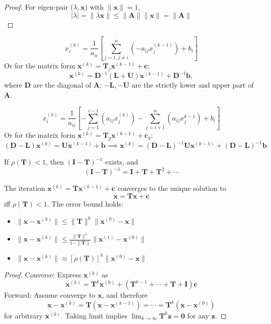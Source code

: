 \begin{proof}
For eigen-pair ($\lambda,\bm x$) with $\|\bm x\|=1$,
\[
|\lambda|=\|\lambda\bm x\|\le\|\bm A\|\|\bm x\|=\|\bm A\|
\]
\end{proof}
\begin{definition}
\[
x_i^{(k)} = \frac{1}{a_{ii}}\left[\sum_{j=1,j\ne i}^n(-a_{ij}x_j^{(k-1)})
+b_i
\right]
\]
Or for the matrix form $\bm x^{(k)}=\bm T_j\bm x^{(k-1)}+\bm c$:
\[
\bm x^{(k)}=\bm D^{-1}(\bm L+\bm U)\bm x^{(k-1)}+\bm D^{-1}\bm b,
\]
where $\bm D$ are the diagonal of $\bm A$; $-\bm L,-\bm U$ are the strictly lower and upper part of $\bm A$.
\end{definition}

\begin{definition}
\[
x_i^{(k)}=\frac{1}{a_{ii}}
\left[
-\sum_{j=1}^{i-1}(a_{ij}x_j^{(k)})-\sum_{j=i+1}^n(a_{ij}x_j^{k-1})+b_i
\right]
\]
Or for the matrix form $\bm x^{(k)}=\bm T_g\bm x^{(k-1)}+\bm c_g$:
\[
(\bm D-\bm L)\bm x^{(k)}=\bm U\bm x^{(k-1)}+\bm b\implies
\bm x^{(k)}=(\bm D-\bm L)^{-1}\bm U\bm x^{(k-1)}+(\bm D-\bm L)^{-1}\bm b
\]
\end{definition}
\begin{proposition}
If $\rho(\bm T)<1$, then $(\bm I-\bm T)^{-1}$ exists, and
\[
(\bm I-\bm T)^{-1}=\bm I+\bm T+\bm T^2+\cdots
\]
\end{proposition}
\begin{proposition}
The iteration
$
\bm x^{(k)}=\bm T\bm x^{(k-1)}+\bm c
$
converges to the unique solution to 
\[
\bm x=\bm T\bm x+\bm c
\]
iff $\rho(\bm T)<1$. The error bound holds:
\begin{itemize}
\item
$\|\bm x-\bm x^{(k)}\|\le\|\bm T\|^k\|\bm x^{(0)}-\bm x\|$
\item
$\|\bm x-\bm x^{(k)}\|\le\frac{\|\bm T\|^k}{1-\|\bm T\|}\|\bm x^{(1)}-\bm x^{(0)}\|$
\item
$\|\bm x-\bm x^{(k)}\|\approx[\rho(\bm T)]^k\|\bm x^{(0)}-\bm x\|$
\end{itemize}
\end{proposition}
\begin{proof}
Converse: Express $\bm x^{(k)}$ as
\[
\bm x^{(k)}=\bm T^k\bm x^{(0)}+(\bm T^{k-1}+\cdots+\bm T+\bm I)\bm c
\]
Forward: Assume converge to $\bm x$, and therefore
\[
\bm x-\bm x^{(k)}=\bm T(\bm x-\bm x^{(k-1)})=\cdots=\bm T^k(\bm x-\bm x^{(0)})
\]
for arbitrary $\bm x^{(0)}.$ Taking limit implies $\lim_{k\to\infty}\bm T^k\bm z=\bm0$ for any $\bm z$.
\end{proof}

